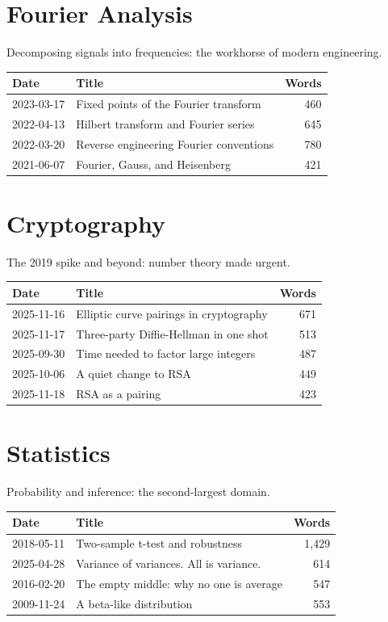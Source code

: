 \bigskip

\section*{Fourier Analysis}

Decomposing signals into frequencies: the workhorse of modern engineering.

\begin{longtable}{l p{5.5cm} r}
\toprule
\textbf{Date} & \textbf{Title} & \textbf{Words} \tabularnewline
\midrule
2023-03-17 & Fixed points of the Fourier transform & 460 \tabularnewline
2022-04-13 & Hilbert transform and Fourier series & 645 \tabularnewline
2022-03-20 & Reverse engineering Fourier conventions & 780 \tabularnewline
2021-06-07 & Fourier, Gauss, and Heisenberg & 421 \tabularnewline
\bottomrule
\end{longtable}

\bigskip

\section*{Cryptography}

The 2019 spike and beyond: number theory made urgent.

\begin{longtable}{l p{5.5cm} r}
\toprule
\textbf{Date} & \textbf{Title} & \textbf{Words} \tabularnewline
\midrule
2025-11-16 & Elliptic curve pairings in cryptography & 671 \tabularnewline
2025-11-17 & Three-party Diffie-Hellman in one shot & 513 \tabularnewline
2025-09-30 & Time needed to factor large integers & 487 \tabularnewline
2025-10-06 & A quiet change to RSA & 449 \tabularnewline
2025-11-18 & RSA as a pairing & 423 \tabularnewline
\bottomrule
\end{longtable}

\bigskip

\section*{Statistics}

Probability and inference: the second-largest domain.

\begin{longtable}{l p{5.5cm} r}
\toprule
\textbf{Date} & \textbf{Title} & \textbf{Words} \tabularnewline
\midrule
2018-05-11 & Two-sample t-test and robustness & 1,429 \tabularnewline
2025-04-28 & Variance of variances. All is variance. & 614 \tabularnewline
2016-02-20 & The empty middle: why no one is average & 547 \tabularnewline
2009-11-24 & A beta-like distribution & 553 \tabularnewline
\bottomrule
\end{longtable}

